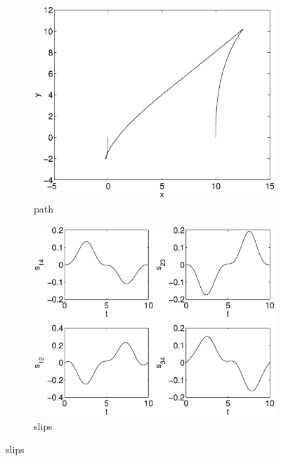 \begin{figure}[h]
\begin{subfigure}[b]{\textwidth}
\centering
\includegraphics[height=0.3\textheight]{img/final_15_15_10_path.eps}
\caption{path}
\end{subfigure}

\begin{subfigure}[b]{\textwidth}
\centering
\includegraphics[height=0.3\textheight]{img/final_15_15_10_slips.eps}
\caption{slips}
\end{subfigure}


\end{figure}
